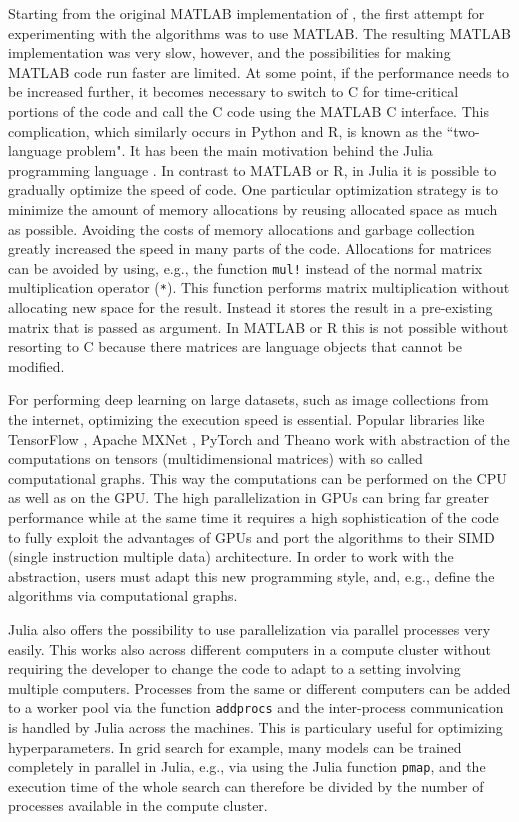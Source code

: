 \documentclass[12pt]{article}
\newcommand{\inlinecode}[1]{\texttt{#1}}
\begin{document}
Starting from the original MATLAB implementation of \cite{hinton_reducing_2006}, the first attempt for experimenting with the algorithms was to use MATLAB.
The resulting MATLAB implementation was very slow, however, and the possibilities for making MATLAB code run faster are limited.
At some point, if the performance needs to be increased further,  it becomes necessary to switch to C for time-critical portions of the code and call the C code using the MATLAB C interface.
This complication, which similarly occurs in Python and R, is known as the ``two-language problem".
It has been the main motivation behind the Julia programming language \citep{bezanson2017julia}.
In contrast to MATLAB or R, in Julia it is possible to gradually optimize the speed of code.
One particular optimization strategy is to minimize the amount of memory allocations by reusing allocated space as much as possible.
Avoiding the costs of memory allocations and garbage collection greatly increased the speed in many parts of the code.
Allocations for matrices can be avoided by using, e.g., the function \inlinecode{mul!} instead of the normal matrix multiplication operator (\inlinecode{*}).
This function performs matrix multiplication without allocating new space for the result.
Instead it stores the result in a pre-existing matrix that is passed as argument.
In MATLAB or R this is not possible without resorting to C because there matrices are language objects that cannot be modified.

For performing deep learning on large datasets, such as image collections from the internet, optimizing the execution speed is essential.
Popular libraries like TensorFlow \citep{abadi2016tensorflow}, Apache MXNet \citep{mxnet}, PyTorch \citep{pytorch} and Theano \citep{theano}
work with abstraction of the computations on tensors (multidimensional matrices) with so called computational graphs.
This way the computations can be performed on the CPU as well as on the GPU.
The high parallelization in GPUs can bring far greater performance while at the same time it requires a high sophistication of the code to fully exploit the advantages of GPUs and port the algorithms to their SIMD (single instruction multiple data) architecture.
In order to work with the abstraction, users must adapt this new programming style, and, e.g., define the algorithms via computational graphs.

Julia also offers the possibility to use parallelization via parallel processes very easily. This works also across different computers in a compute cluster without requiring the developer to change the code to adapt to a setting involving multiple computers.
Processes from the same or different computers can be added to a worker pool via the function \inlinecode{addprocs} and the inter-process communication is handled by Julia across the machines.
This is particulary useful for optimizing hyperparameters.
In grid search \citep{bergstra_algorithms_2011} for example, many models can be trained completely in parallel in Julia, e.g., via using the Julia function  \inlinecode{pmap}, and the execution time of the whole search can therefore be divided by the number of processes available in the compute cluster.
\end{document}
